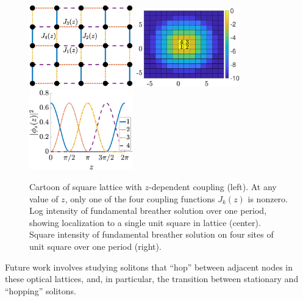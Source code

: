 \documentclass[11pt,reqno,oneside]{article}
\theoremstyle{definition}
\theoremstyle{remark}
\begin{document}
\begin{figure}
    \centering
    \includegraphics[width=4.5cm]{images/lattice.eps}
    \includegraphics[width=4.5cm]{images/fundc1map.eps}
    \includegraphics[width=4.5cm]{images/fundc1sol.eps}
    \caption{Cartoon of square lattice with $z$-dependent coupling (left). At any value of $z$, only one of the four coupling functions $J_k(z)$ is nonzero. Log intensity of fundamental breather solution over one period, showing localization to a single unit square in lattice (center). Square intensity of fundamental breather solution on four sites of unit square over one period (right).}
    \label{fig:Rechtsman}
\end{figure} 
Future work involves studying solitons that ``hop'' between adjacent nodes in these optical lattices, and, in particular, the transition between stationary and ``hopping'' solitons.

% 
\end{document}
